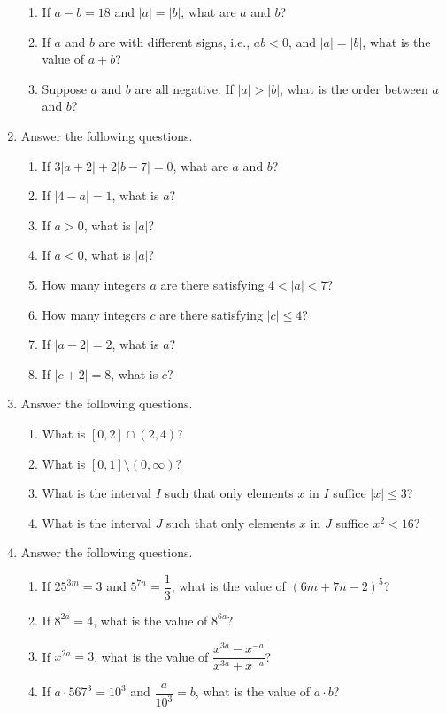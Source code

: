 \documentclass[11pt]{book}
\theoremstyle{break}
\theoremstyle{no_label}
\numberwithin{equation}{section}
\begin{document}
\begin{enumerate}[label=\arabic*.]
\begin{enumerate}
        \item If $a-b=18$ and $|a|=|b|$, what are $a$ and $b$?
        \item If $a$ and $b$ are with different signs, i.e., $ab<0$, and $|a|=|b|$, what is the value of $a+b$?
        \item Suppose $a$ and $b$ are all negative. If $|a|>|b|$, what is the order between $a$ and $b$?
    \end{enumerate}
    \item Answer the following questions.
    \begin{enumerate}
        \item If $3|a+2|+2|b-7|=0$, what are $a$ and $b$?
        \item If $|4-a|=1$, what is $a$?
        \item If $a>0$, what is $|a|$?
        \item If $a<0$, what is $|a|$?
        \item How many integers $a$ are there satisfying $4<|a|<7$?
        \item How many integers $c$ are there satisfying $|c|\leq 4$?
        \item If $|a-2|=2$, what is $a$?
        \item If $|c+2|=8$, what is $c$?
    \end{enumerate}
    \item Answer the following questions.
    \begin{enumerate}
        \item What is $[0, 2]\cap(2, 4)$?
        \item What is $[0, 1]\setminus(0, \infty)$?
        \item What is the interval $I$ such that only elements $x$ in $I$ suffice $|x|\leq 3$?
        \item What is the interval $J$ such that only elements $x$ in $J$ suffice $x^2<16$?
    \end{enumerate}
    \item Answer the following questions.
    \begin{enumerate}
        \item If $25^{3m}=3$ and $5^{7n}=\dfrac{1}{3}$, what is the value of $(6m+7n-2)^5$?
        \item If $8^{2a}=4$, what is the value of $8^{6a}$?
        \item If $x^{2a}=3$, what is the value of $\dfrac{x^{3a}-x^{-a}}{x^{3a}+x^{-a}}$?
        \item If $a\cdot567^3=10^3$ and $\dfrac{a}{10^3}=b$, what is the value of $a\cdot b$?

\end{enumerate}
\end{enumerate}
\end{document}
